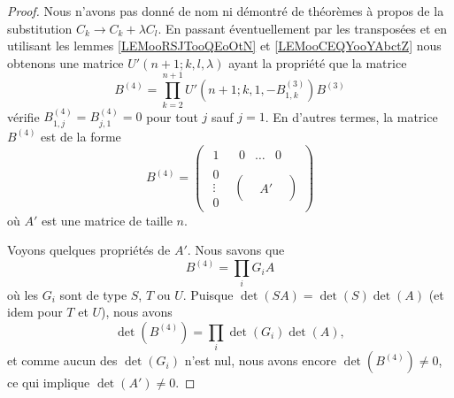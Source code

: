 \begin{proof}
	Nous n'avons pas donné de nom ni démontré de théorèmes à propos de la substitution \( C_k\to C_k+\lambda C_l\). En passant éventuellement par les transposées et en utilisant les lemmes \ref{LEMooRSJTooQEoOtN} et \ref{LEMooCEQYooYAbctZ} nous obtenons une matrice \( U'(n+1;k,l,\lambda)\) ayant la propriété que la matrice
	\begin{equation}
		B^{(4)}=\prod_{k=2}^{n+1} U'(n+1;k,1,-B^{(3)}_{1,k})B^{(3)}
	\end{equation}
	vérifie \( B^{(4)}_{1,j}=B^{(4)}_{j,1}=0\) pour tout \( j\) sauf \( j=1\). En d'autres termes, la matrice \( B^{(4)}\) est de la forme
	\begin{equation}
		B^{(4)}=\begin{pmatrix}
			\begin{matrix} 1 \end{matrix} & \begin{matrix}
				                                0 & \ldots & 0
			                                \end{matrix} \\
			\begin{matrix}
				0      \\
				\vdots \\
				0
			\end{matrix}                & \begin{pmatrix}
				                               &    & \\
				                               & A' & \\
				                               &    &
			                              \end{pmatrix}
		\end{pmatrix}
	\end{equation}
	où \( A'\) est une matrice de taille \( n\).

	Voyons quelques propriétés de \( A'\). Nous savons que
	\begin{equation}
		B^{(4)}=\prod_i G_iA
	\end{equation}
	où les \( G_i\) sont de type \( S\), \( T\) ou \( U\). Puisque \( \det(SA)=\det(S)\det(A)\) (et idem pour \( T\) et \( U\)), nous avons
	\begin{equation}
		\det(B^{(4)})=\prod_i\det(G_i)\det(A),
	\end{equation}
	et comme aucun des \( \det(G_i)\) n'est nul, nous avons encore \( \det(B^{(4)})\neq 0\), ce qui implique \( \det(A')\neq 0\).


\end{proof}
